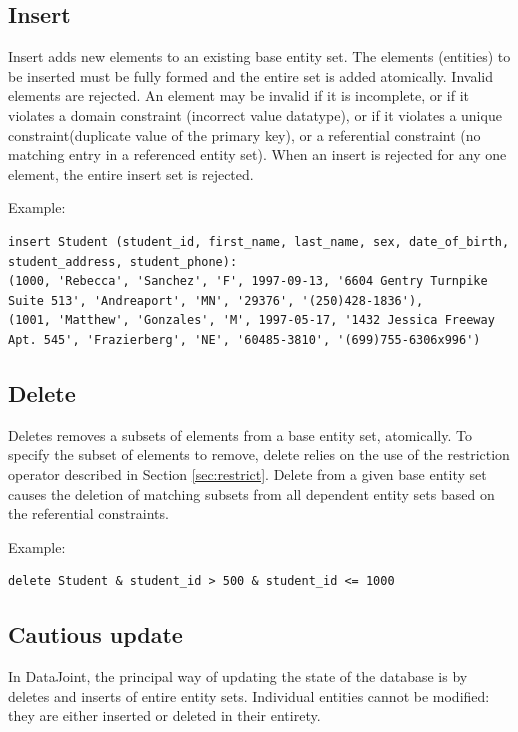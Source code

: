 \documentclass[letter,10pt]{article}
\newcommand{\datajoint}{DataJoint\xspace}
\begin{document}
\subsection{Insert}
Insert adds new elements to an existing base entity set.  
The elements (entities) to be inserted must be fully formed and the entire set is added atomically.
Invalid elements are rejected. 
An element may be invalid if it is incomplete, or if it violates a domain constraint (incorrect value datatype), or if it violates a unique constraint(duplicate value of the primary key), or a referential constraint (no matching entry in a referenced entity set).
When an insert is rejected for any one element, the entire insert set is rejected.

Example:
\begin{lstlisting}[language=dj]
insert Student (student_id, first_name, last_name, sex, date_of_birth, student_address, student_phone):
(1000, 'Rebecca', 'Sanchez', 'F', 1997-09-13, '6604 Gentry Turnpike Suite 513', 'Andreaport', 'MN', '29376', '(250)428-1836'),
(1001, 'Matthew', 'Gonzales', 'M', 1997-05-17, '1432 Jessica Freeway Apt. 545', 'Frazierberg', 'NE', '60485-3810', '(699)755-6306x996')
\end{lstlisting}

\subsection{Delete}
Deletes removes a subsets of elements from a base entity set, atomically.
To specify the subset of elements to remove, delete relies on the use of the restriction operator described in Section \ref{sec:restrict}.
Delete from a given base entity set causes the deletion of matching subsets from all dependent entity sets based on the referential constraints.

Example: 
\begin{lstlisting}[language=dj]
delete Student & student_id > 500 & student_id <= 1000
\end{lstlisting}

\subsection{Cautious update}
In \datajoint, the principal way of updating the state of the database is by deletes and inserts of entire entity sets.  
Individual entities cannot be modified: they are either inserted or deleted in their entirety. 
\end{document}
